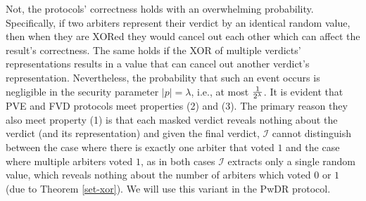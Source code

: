  
 Not,  the protocols' correctness holds with an overwhelming probability. Specifically, if two arbiters  represent their verdict by an identical random value, then when they are XORed they would cancel out each other which can affect the result's correctness. The same holds if the XOR of  multiple verdicts' representations results in a value that can cancel out another verdict's representation. Nevertheless, the probability that such an event occurs is negligible in the security parameter $|p|=\lambda$, i.e., at most   $\frac{1}{2^{\scriptscriptstyle \lambda}}$. It is evident that PVE and FVD protocols meet properties (2) and (3). The primary reason they also meet  property (1) is that each masked verdict reveals nothing about the verdict (and its representation) and  given the final verdict, $\mathcal{I}$ cannot distinguish between the case where there is exactly one arbiter that voted  $1$ and the case where multiple arbiters voted $1$, as in both cases $\mathcal{I}$   extracts only a single random value, which reveals nothing about the number of arbiters which voted $0$ or $1$ (due to Theorem \ref{set-xor}). We will use this variant in the PwDR protocol. 




